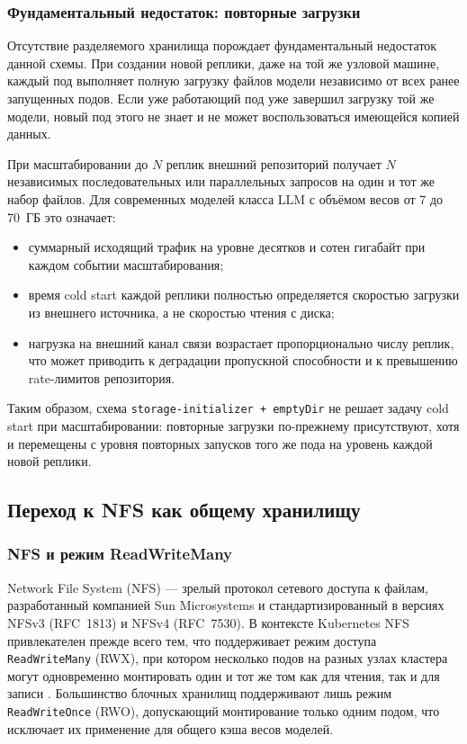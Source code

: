 \subsubsection*{Фундаментальный недостаток: повторные загрузки}

Отсутствие разделяемого хранилища порождает фундаментальный недостаток данной схемы. При создании новой реплики, даже на той же узловой машине, каждый под выполняет полную загрузку файлов модели независимо от всех ранее запущенных подов. Если уже работающий под уже завершил загрузку той же модели, новый под этого не знает и не может воспользоваться имеющейся копией данных.

При масштабировании до $N$ реплик внешний репозиторий получает $N$ независимых последовательных или параллельных запросов на один и тот же набор файлов. Для современных моделей класса LLM с объёмом весов от 7 до 70~ГБ это означает:
\begin{itemize}[leftmargin=*]
  \item суммарный исходящий трафик на уровне десятков и сотен гигабайт при каждом событии масштабирования;
  \item время cold start каждой реплики полностью определяется скоростью загрузки из внешнего источника, а не скоростью чтения с диска;
  \item нагрузка на внешний канал связи возрастает пропорционально числу реплик, что может приводить к деградации пропускной способности и к превышению rate-лимитов репозитория.
\end{itemize}

Таким образом, схема \texttt{storage-initializer + emptyDir} не решает задачу cold start при масштабировании: повторные загрузки по-прежнему присутствуют, хотя и перемещены с уровня повторных запусков того же пода на уровень каждой новой реплики.

\subsection{Переход к NFS как общему хранилищу}

\subsubsection*{NFS и режим ReadWriteMany}

Network File System (NFS) --- зрелый протокол сетевого доступа к файлам, разработанный компанией Sun Microsystems и стандартизированный в версиях NFSv3 (RFC~1813) и NFSv4 (RFC~7530). В контексте Kubernetes NFS привлекателен прежде всего тем, что поддерживает режим доступа \texttt{ReadWriteMany} (RWX), при котором несколько подов на разных узлах кластера могут одновременно монтировать один и тот же том как для чтения, так и для записи \cite{nfs_k8s_docs}. Большинство блочных хранилищ поддерживают лишь режим \texttt{ReadWriteOnce} (RWO), допускающий монтирование только одним подом, что исключает их применение для общего кэша весов моделей.

